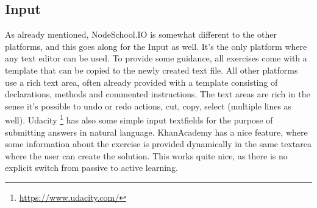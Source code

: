 \documentclass{article}
\begin{document}
\subsection{Input}
As already mentioned, NodeSchool.IO is somewhat different to the other
platforms, and this goes along for the Input as well. It's the only platform
where any
text editor can be used. To provide some guidance, all exercises come with a 
template that can be copied to the newly created text file. All other platforms
use a rich text area, often already provided with a template consisting of 
declarations, methods and commented instructions. The text areas are rich in the
sense it's possible to undo or redo actions, cut, copy, select (multiple lines 
as well). Udacity
\footnote{\url{https://www.udacity.com/}} has also some simple input textfields
for the purpose of submitting answers in natural language. KhanAcademy has a
nice feature, where some information about the exercise is provided dynamically
in the same textarea where the user can create the solution. This works quite
nice, as there is no explicit switch from passive to active learning.
\end{document}
